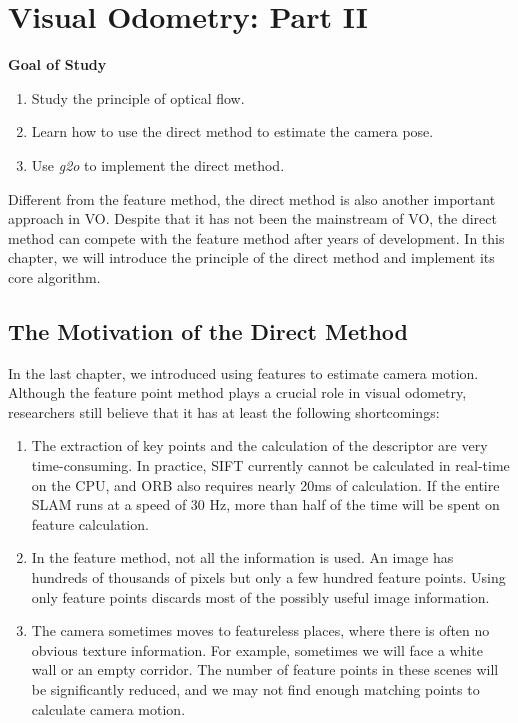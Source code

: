 \chapter{Visual Odometry: Part II}
\label{cpt:vo2}
\label{cpt:8}
\begin{mdframed}  
	\textbf{Goal of Study}
	\begin{enumerate}[labelindent=0em,leftmargin=1.5em]
		\item Study the principle of optical flow.
		\item Learn how to use the direct method to estimate the camera pose.
        \item Use \textit{g2o} to implement the direct method.
	\end{enumerate}
\end{mdframed}

Different from the feature method, the direct method is also another important approach in VO. Despite that it has not been the mainstream of VO, the direct method can compete with the feature method after years of development. In this chapter, we will introduce the principle of the direct method and implement its core algorithm.

%

\newpage
\section{The Motivation of the Direct Method}
In the last chapter, we introduced using features to estimate camera motion. Although the feature point method plays a crucial role in visual odometry, researchers still believe that it has at least the following shortcomings:

\begin{enumerate}
	\item The extraction of key points and the calculation of the descriptor are very time-consuming. In practice, SIFT currently cannot be calculated in real-time on the CPU, and ORB also requires nearly 20ms of calculation. If the entire SLAM runs at a speed of 30 Hz, more than half of the time will be spent on feature calculation.

	\item In the feature method, not all the information is used. An image has hundreds of thousands of pixels but only a few hundred feature points. Using only feature points discards most of the possibly useful image information. 
	
	\item The camera sometimes moves to featureless places, where there is often no obvious texture information. For example, sometimes we will face a white wall or an empty corridor. The number of feature points in these scenes will be significantly reduced, and we may not find enough matching points to calculate camera motion.
\end{enumerate}

